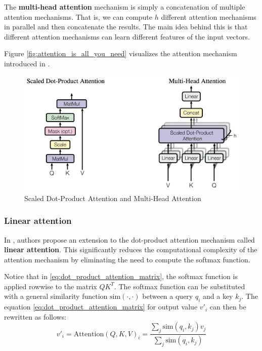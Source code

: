\documentclass[a4paper, twoside]{report}
\theoremstyle{definition}
\numberwithin{equation}{section}
\begin{document}
The \textbf{multi-head attention} mechanism is simply a concatenation of multiple attention mechanisms.
That is, we can compute $h$ different attention mechanisms in parallel and then concatenate the results.
The main idea behind this is that different attention mechanisms can learn different features of the input vectors.

Figure \ref{fig:attention_is_all_you_need} visualizes the attention mechanism introduced in \cite{1706.03762}.

\begin{figure}[h!]
    \centering
    \includegraphics[scale=0.15]{scaled_dot_product_attention.png}
    \caption{Scaled Dot-Product Attention and Multi-Head Attention \cite{1706.03762}}
    \label{fig:scaled_dot_product_attention}
\end{figure}




\subsubsection{Linear attention}

In \cite{2006.16236}, authors propose an extension to the dot-product attention mechanism called \textbf{linear attention}.
This significantly reduces the computational complexity of the attention mechanism by eliminating the need to compute the softmax function.

Notice that in \ref{eq:dot_product_attention_matrix}, the softmax function is applied rowwise to the matrix $Q K^T$.
The softmax function can be substituted with a general similarity function $\text{sim}(\cdot, \cdot)$ between a query $q_i$ and a key $k_j$.
The equation \ref{eq:dot_product_attention_matrix} for output value $v'_i$ can then be rewritten as follows:
\begin{equation}
    v'_i=\text{Attention}(Q, K, V)_i=\frac{\sum_j \text{sim}(q_i, k_j) v_j}{\sum_j \text{sim}(q_i, k_j)}
\end{equation}
\end{document}
